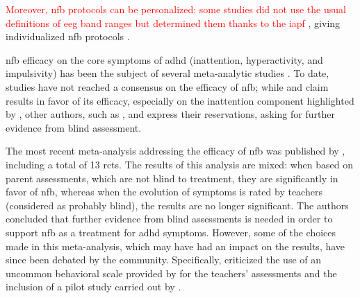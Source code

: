 \textcolor{red}{Moreover, \gls{nfb} protocols can be personalized: some studies did not use the usual definitions of \gls{eeg} band ranges 
but determined them thanks to the \gls{iapf}} \citep{Klimesch1999}, giving individualized \gls{nfb} protocols \citep{Liu2016, Escolano2014, Bazanova2018}.

\Gls{nfb} efficacy on the core symptoms of \gls{adhd} (inattention, hyperactivity, and impulsivity) has been the 
subject of several meta-analytic studies \citep{Loo2005, Lofthouse2012, Arns2009, Micoulaud2014, Sonuga-Barke2013}. 
To date, studies have not reached a consensus on the efficacy of \gls{nfb}; while \citet{Arns2009} and \citet{Micoulaud2014} 
claim results in favor of its efficacy, especially on the inattention component highlighted by \citeauthor{Micoulaud2014}, other authors, such as
\citet{Loo2005, Lofthouse2012}, and \citet{Sonuga-Barke2013} express their reservations, asking for further evidence from blind assessment.

The most recent meta-analysis addressing the efficacy of \gls{nfb} was published by \citet{Cortese2016}, including a total of 13
\glspl{rct}. The results of this analysis are mixed: when based on parent assessments, which are not blind to treatment, they are significantly 
in favor of \gls{nfb}, whereas when the evolution of symptoms is rated by teachers (considered as probably blind), the results are no longer 
significant. The authors concluded that further evidence from blind assessments is needed in order to support \gls{nfb} as a treatment for \gls{adhd} symptoms.
However, some of the choices made in this meta-analysis, which may have had an impact on the results, have since been debated by the community. Specifically, 
\citet{Micoulaud2016} criticized the use of an uncommon behavioral scale provided by \citet{Steiner2014} for the teachers' assessments 
and the inclusion of a pilot study carried out by \citet{Arnold2014}. 

